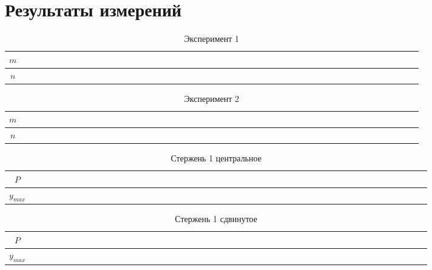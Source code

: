 \documentclass[a4paper,12pt]{article} %
\begin{document}
\section{Результаты измерений}
\begin{table}[!ht]
    \centering
    \begin{tabular}{|c|c|c|c|c|c|c|c|c|c|c}
        \hline
    $ m $   & ~~~~~~~~ & ~~~~~~~~ & ~~~~~~~~ & ~~~~~~~~ & ~~~~~~~~ & ~~~~~~~~ & ~~~~~~~~ &  ~~~~~~~~ \\ \hline
    $n$ & ~~~~~~~~ & ~~~~~~~~ & ~~~~~~~~ & ~~~~~~~~ & ~~~~~~~~ & ~~~~~~~~ & ~~~~~~~~ &  ~~~~~~~~\\ \hline
    \end{tabular}
    \caption{Эксперимент 1}
\end{table}
\begin{table}[!ht]
    \centering
    \begin{tabular}{|c|c|c|c|c|c|c|c|c|c|c}
        \hline
    $ m $   & ~~~~~~~~ & ~~~~~~~~ & ~~~~~~~~ & ~~~~~~~~ & ~~~~~~~~ & ~~~~~~~~ & ~~~~~~~~ &  ~~~~~~~~ \\ \hline
    $ n $ & ~~~~~~~~ & ~~~~~~~~ & ~~~~~~~~ & ~~~~~~~~ & ~~~~~~~~ & ~~~~~~~~ & ~~~~~~~~ &  ~~~~~~~~\\ \hline
    \end{tabular}
    \caption{Эксперимент 2}
\end{table}
\begin{table}[!ht]
    \centering
    \begin{tabular}{|c|c|c|c|c|c|c|c|c|c|c}
        \hline
    $ P $   & ~~~~~~~~ & ~~~~~~~~ & ~~~~~~~~ & ~~~~~~~~ & ~~~~~~~~ & ~~~~~~~~ & ~~~~~~~~ &  ~~~~~~~~ \\ \hline
    $y_{max}$ & ~~~~~~~~ & ~~~~~~~~ & ~~~~~~~~ & ~~~~~~~~ & ~~~~~~~~ & ~~~~~~~~ & ~~~~~~~~ &  ~~~~~~~~\\ \hline
    \end{tabular}
    \caption{Стержень 1 центральное}
\end{table}
\begin{table}[!ht]
    \centering
    \begin{tabular}{|c|c|c|c|c|c|c|c|c|c|c}
        \hline
    $ P $   & ~~~~~~~~ & ~~~~~~~~ & ~~~~~~~~ & ~~~~~~~~ & ~~~~~~~~ & ~~~~~~~~ & ~~~~~~~~ &  ~~~~~~~~ \\ \hline
    $y_{max}$ & ~~~~~~~~ & ~~~~~~~~ & ~~~~~~~~ & ~~~~~~~~ & ~~~~~~~~ & ~~~~~~~~ & ~~~~~~~~ &  ~~~~~~~~\\ \hline
    \end{tabular}
    \caption{Стержень 1 сдвинутое}
\end{table}
\end{document}
